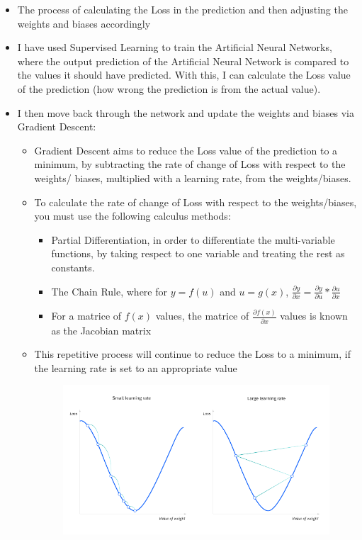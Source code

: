 \documentclass[./project-report/src/latex/project-report.tex]{subfiles}
\begin{document}
\begin{itemize}
    \begin{itemize}
        \item The process of calculating the Loss in the prediction and then adjusting the weights and biases accordingly
        \item I have used Supervised Learning to train the Artificial Neural Networks, where the output prediction of the Artificial Neural Network is compared to the 
              values it should have predicted. With this, I can calculate the Loss value of the prediction (how wrong the prediction is from the actual value).
        \item I then move back through the network and update the weights and biases via Gradient Descent:
        \begin{itemize}
            \item Gradient Descent aims to reduce the Loss value of the prediction to a minimum, by subtracting the rate of change of Loss with respect to the weights/
                  biases, multiplied with a learning rate, from the weights/biases.
            \item To calculate the rate of change of Loss with respect to the weights/biases, you must use the following calculus methods:
            \begin{itemize}
                \item Partial Differentiation, in order to differentiate the multi-variable functions, by taking respect to one variable and treating the rest as 
                      constants.
                \item The Chain Rule, where for $y = f(u)$ and $u = g(x)$, 
                      $\frac{\partial{y}}{\partial{x}} = \frac{\partial{y}}{\partial{u}} * \frac{\partial{u}}{\partial{x}}$
                \item For a matrice of $f(x)$ values, the matrice of $\frac{\partial{f(x)}}{\partial{x}}$ values is known as the Jacobian matrix
            \end{itemize}
            \item This repetitive process will continue to reduce the Loss to a minimum, if the learning rate is set to an appropriate value
                \begin{figure}[h!]
                \centering
                \includegraphics[width=1\textwidth]{./project-report/src/images/gradient-descent.png}

\end{figure}
\end{itemize}
\end{itemize}
\end{itemize}
\end{document}

